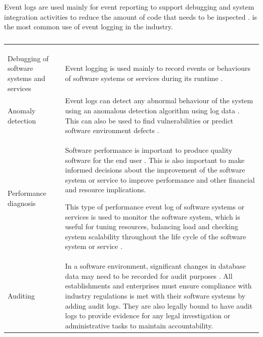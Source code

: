 Event logs are used mainly for event reporting to support debugging and system integration activities to reduce the amount of code that needs to be inspected \cite{Baccanico2014}.  is the most common use of event logging in the industry.

\begin{xltabular}{\textwidth}{p{4cm}X}
	\caption[Event logs usage]
	{\textit{Event logs usage}}
	\label{tbl:ch1_eventLogsUsage} \\
	\toprule
	 &  \\
	\midrule
	\endfirsthead

	\caption[]{\continueCaption} \\
	\toprule
	 &  \\
	\midrule
	\endhead

	\midrule
	 \\ 
	\endfoot
	\endlastfoot

	\RaggedRight Debugging of software systems and services & \RaggedRight Event logging is used mainly to record events or behaviours of software systems or services during its runtime \cite{Rong2018a}. \\

	\RaggedRight Anomaly detection & \RaggedRight Event logs can detect any abnormal behaviour of the system using an anomalous detection algorithm using log data \cite{Gurumdimma2016}. This can also be used to find vulnerabilities or predict software environment defects \cite{Dwyer2013}. \\

	Performance diagnosis & \RaggedRight Software performance is important to produce quality software for the end user \cite{EvangelinGeetha2007, Baccanico2014}. This is also important to make informed decisions about the improvement of the software system or service to improve performance and other financial and resource implications. \par This type of performance event log of software systems or services is used to monitor the software system, which is useful for tuning resources, balancing load and checking system scalability throughout the life cycle of the software system or service \cite{Song2017}. \\
	
	Auditing & \RaggedRight In a software environment, significant changes in database data may need to be recorded for audit purposes \cite{Rong2018a}. All establishments and enterprises must ensure compliance with industry regulations is met with their software systems by adding audit logs. They are also legally bound to have audit logs to provide evidence for any legal investigation or administrative tasks to maintain accountability. \\


\end{xltabular}
